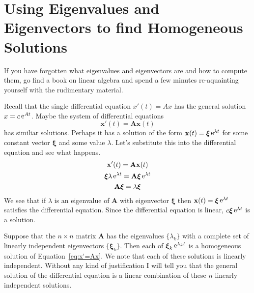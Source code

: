 \section{Using Eigenvalues and Eigenvectors to find Homogeneous Solutions}







If you have forgotten what eigenvalues and eigenvectors are and how to compute
them, go find
a book on linear algebra and spend a few minutes re-aquainting yourself 
with the rudimentary material.


Recall that the single differential equation $x'(t) = A x$ has the general
solution $x = c \mathop{\mathrm{e}}\nolimits^{A t}$.  Maybe the system of differential equations 
\begin{equation}
  \label{eq:x'=Ax}
  \mathbf{x}'(t) = \mathbf{A} \mathbf{x}(t)
\end{equation}
has similiar solutions.  Perhaps it has a solution
of the form $\mathbf{x}(t) = \boldsymbol{\xi} \mathop{\mathrm{e}}\nolimits^{\lambda t}$ for some constant vector $\boldsymbol{\xi}$ and 
some value $\lambda$.  Let's substitute this into the differential equation
and see what happens.
\begin{gather*}
  \mathbf{x}'(t) = \mathbf{A} \mathbf{x}(t)
  \\
  \boldsymbol{\xi} \lambda \mathop{\mathrm{e}}\nolimits^{\lambda t} = \mathbf{A} \boldsymbol{\xi} \mathop{\mathrm{e}}\nolimits^{\lambda t}
  \\
  \mathbf{A} \boldsymbol{\xi} = \lambda \boldsymbol{\xi}
\end{gather*}
We see that if $\lambda$ is an eigenvalue of $\mathbf{A}$ with eigenvector $\boldsymbol{\xi}$
then $\mathbf{x}(t) = \boldsymbol{\xi} \mathop{\mathrm{e}}\nolimits^{\lambda t}$ satisfies the differential equation.  Since 
the differential equation is linear, $c \boldsymbol{\xi} \mathop{\mathrm{e}}\nolimits^{\lambda t}$ is a solution.

Suppose that the $n \times n$ matrix $\mathbf{A}$ has the eigenvalues $\{ \lambda_k \}$ 
with a complete
set of linearly independent eigenvectors $\{ \boldsymbol{\xi}_k \}$.  Then each of
$\boldsymbol{\xi}_k \mathop{\mathrm{e}}\nolimits^{\lambda_k t}$ is a homogeneous solution of Equation~\ref{eq:x'=Ax}.
We note that each of these solutions is linearly independent.  Without
any kind of justification I will tell you that the general solution of
the differential equation is a linear combination of these $n$ linearly 
independent solutions.



